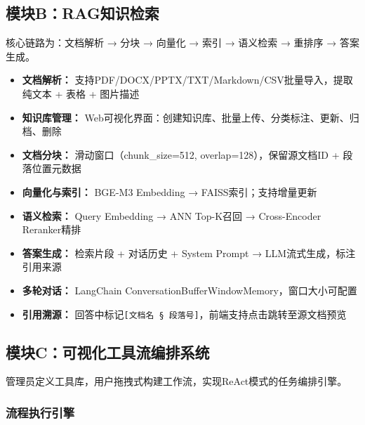 \documentclass[a4paper,zihao=-4]{ctexart}
\begin{document}
\subsection{模块B：RAG知识检索}

核心链路为：文档解析 → 分块 → 向量化 → 索引 → 语义检索 → 重排序 → 答案生成。

\begin{itemize}
  \item \textbf{文档解析：} 支持PDF/DOCX/PPTX/TXT/Markdown/CSV批量导入，提取纯文本 + 表格 +
        图片描述
  \item \textbf{知识库管理：} Web可视化界面：创建知识库、批量上传、分类标注、更新、归档、删除
  \item \textbf{文档分块：} 滑动窗口（chunk\_size=512, overlap=128），保留源文档ID + 段落位置元数据
  \item \textbf{向量化与索引：} BGE-M3 Embedding → FAISS索引；支持增量更新
  \item \textbf{语义检索：} Query Embedding → ANN Top-K召回 → Cross-Encoder
        Reranker精排
  \item \textbf{答案生成：} 检索片段 + 对话历史 + System Prompt → LLM流式生成，标注引用来源
  \item \textbf{多轮对话：} LangChain ConversationBufferWindowMemory，窗口大小可配置
  \item \textbf{引用溯源：} 回答中标记\texttt{[文档名 § 段落号]}，前端支持点击跳转至源文档预览
\end{itemize}

\subsection{模块C：可视化工具流编排系统}

管理员定义工具库，用户拖拽式构建工作流，实现ReAct模式的任务编排引擎。

\subsubsection{流程执行引擎}
\end{document}
